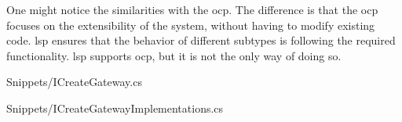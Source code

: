 One might notice the similarities with the \gls{ocp}. The difference is that the \gls{ocp}
focuses on the extensibility of the system, without having to modify existing code.
\gls{lsp} ensures that the behavior of different subtypes is following the required
functionality. \gls{lsp} supports \gls{ocp}, but it is not the only way of doing so.


    {Snippets/ICreateGateway.cs}


    {Snippets/ICreateGatewayImplementations.cs}

